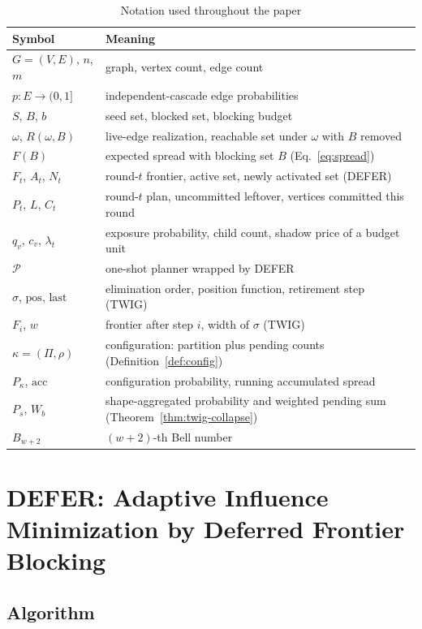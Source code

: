 \documentclass[ASNA,number]{USG}
\newcommand{\up}{\rule{0pt}{2.6ex}}
\newcommand{\down}{\rule[-1.2ex]{0pt}{0pt}}
\newcommand{\Rspread}{R}
\newcommand{\FF}{F}
\begin{document}
\begin{table}[h]
\centering
\caption{Notation used throughout the paper\label{tab:notation}}
\begin{tabular}{@{}ll@{}}
\hline
\up Symbol & Meaning \\
\hline
\up $G=(V,E)$, $n$, $m$ & graph, vertex count, edge count \\
$p:E\to(0,1]$ & independent-cascade edge probabilities \\
$S$, $B$, $b$ & seed set, blocked set, blocking budget \\
$\omega$, $\Rspread(\omega,B)$ & live-edge realization, reachable set under $\omega$ with $B$ removed \\
$\FF(B)$ & expected spread with blocking set $B$ (Eq.~\ref{eq:spread}) \\
$F_t$, $A_t$, $N_t$ & round-$t$ frontier, active set, newly activated set (DEFER) \\
$P_t$, $L$, $C_t$ & round-$t$ plan, uncommitted leftover, vertices committed this round \\
$q_v$, $c_v$, $\lambda_t$ & exposure probability, child count, shadow price of a budget unit \\
$\mathcal P$ & one-shot planner wrapped by DEFER \\
$\sigma$, $\mathrm{pos}$, $\mathrm{last}$ & elimination order, position function, retirement step (TWIG) \\
$F_i$, $w$ & frontier after step $i$, width of $\sigma$ (TWIG) \\
$\kappa=(\Pi,\rho)$ & configuration: partition plus pending counts (Definition~\ref{def:config}) \\
$P_\kappa$, $\mathrm{acc}$ & configuration probability, running accumulated spread \\
$P_s$, $W_b$ & shape-aggregated probability and weighted pending sum (Theorem~\ref{thm:twig-collapse}) \\
\down $B_{w+2}$ & $(w+2)$-th Bell number \\
\hline
\end{tabular}
\end{table}

\section{DEFER: Adaptive Influence Minimization by Deferred Frontier Blocking}\label{sec:defer}

\subsection{Algorithm}\label{sec:defer-algo}
\end{document}
